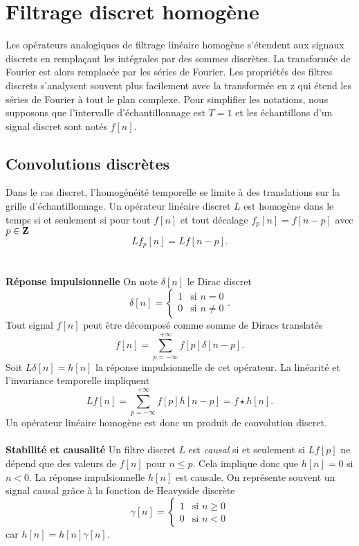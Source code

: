 \section{Filtrage discret homog\`ene}

Les op\'erateurs analogiques de filtrage lin\'eaire homog\`ene
s'\'etendent aux signaux discrets en rempla\c{c}ant les
int\'egrales par des sommes discr\`etes.
La transform\'ee de Fourier est alors remplac\'ee par les
s\'eries de Fourier. Les propri\'et\'es des filtres discrets
s'analysent souvent plus facilement
avec la transform\'ee en z qui \'etend les
s\'eries de Fourier \`a tout le plan complexe.
Pour simplifier
les notations, nous supposons que l'intervalle d'\'echantillonnage
est $T=1$ et les \'echantillons d'un signal discret sont not\'es
$f[n]$.

\subsection{Convolutions discr\`etes}
\label{sec-conv}
Dans le cas discret, l'homog\'en\'eit\'e temporelle se limite
\`a des translations sur la grille d'\'echantillonnage.
Un op\'erateur lin\'eaire discret $L$ est homog\`ene dans le
temps si et seulement si pour tout $f[n]$ et tout
d\'ecalage $f_p [n] = f[n-p]$ avec $p \in {\bf{Z}}$
\[
L f_p [n] = Lf[n-p] .
\]
\\
\\
{\bf R\'eponse impulsionnelle}
On note $\delta [n]$ le Dirac discret
\begin{equation}
\delta [n] =
   \left \{ \begin{array}{ll}
            1 & \mbox{si $n = 0$}\\
            0 & \mbox{si $n \neq 0$}
            \end{array} .
   \right.
\end{equation}
Tout signal $f[n]$ peut \^etre d\'ecompos\'e
comme somme de Diracs translat\'es
\[
f[n] = \sum_{p=-\infty}^{+\infty} f[p] \delta [n-p] .
\]
Soit $L\delta[n] = h[n]$ la r\'eponse impulsionnelle
de cet op\'erateur.
La lin\'earit\'e et l'invariance temporelle impliquent
\[
Lf[n] = \sum_{p=-\infty}^{+\infty} f[p] h [n-p] = f \star h [n].
\]
Un op\'erateur lin\'eaire homog\`ene est donc un produit de
convolution discret.
\\
\\
{\bf Stabilit\'e et causalit\'e}
Un filtre discret $L$
est
{\it causal} si et seulement si $Lf[p]$ ne
d\'epend que des valeurs de $f[n]$ pour $n \leq p$. Cela
implique donc que $h[n] = 0$ si $n < 0$.
La r\'eponse impulsionnelle $h[n]$ est causale.
On repr\'esente souvent un signal causal gr\^ace \`a la fonction
de Heavyside discr\`ete
\begin{equation}
\gamma [n] =
   \left \{ \begin{array}{ll}
            1 & \mbox{si $n \geq 0$}\\
            0 & \mbox{si $n < 0$}
            \end{array}
   \right.
\end{equation}
car $h[n] = h[n] \gamma [n]$.


